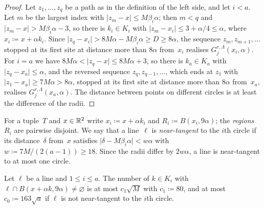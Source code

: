 \documentclass[11pt,letterpaper]{article}
\begin{document}
\begin{proof}
Let $z_1,\dots,z_q$ be a path as in the definition of the left side, and let $i<a$. Let $m$ be the largest index with $\lvert z_m-x\rvert\le M\beta_i\alpha$; then $m<q$ and $\lvert z_m-x\rvert>M\beta_i\alpha-3$, so there is $k_i\in K_i$ with $\lvert z_m-x_i\rvert\le3+\alpha/4\le\alpha$, where $x_i\coloneqq x+\alpha k_i$. Since $\lvert z_q-x_i\rvert>8M\alpha-M\beta_i\alpha\ge D\ge8\alpha$, the sequence $z_m,z_{m+1},\dots$ stopped at its first site at distance more than $8\alpha$ from~$x_i$ realises $G_j^{r,\Lambda}(x_i,\alpha)$. For $i=a$ we have $8M\alpha<\lvert z_q-x\rvert\le8M\alpha+3$, so there is $k_a\in K_a$ with $\lvert z_q-x_a\rvert\le\alpha$, and the reversed sequence $z_q,z_{q-1},\dots$, which ends at $z_1$ with $\lvert z_1-x_a\rvert\ge7M\alpha>8\alpha$, stopped at its first site at distance more than $8\alpha$ from~$x_a$, realises $G_j^{r,\Lambda}(x_a,\alpha)$. The distance between points on different circles is at least the difference of the radii.
\end{proof}

For a tuple~$T$ and $x\in\mathbb R^2$ write $x_i\coloneqq x+\alpha k_i$ and $R_i\coloneqq B(x_i,9\alpha)$; the \emph{regions} $R_i$ are pairwise disjoint. We say that a line~$\ell$ is \emph{near-tangent} to the $i$th circle if its distance~$\delta$ from~$x$ satisfies $\lvert\delta-M\beta_i\alpha\rvert<w\alpha$ with $w\coloneqq7M/(2(a-1))\ge18$. Since the radii differ by $2w\alpha$, a line is near-tangent to at most one circle.

\begin{lemma}
\label{lem:chord}
Let $\ell$ be a line and $1\le i\le a$. The number of $k\in K_i$ with $\ell\cap B(x+\alpha k,9\alpha)\neq\varnothing$ is at most $c_1\sqrt M$ with $c_1\coloneqq80$, and at most $c_0\coloneqq163\sqrt a$ if $\ell$ is not near-tangent to the $i$th circle.
\end{lemma}
\end{document}
